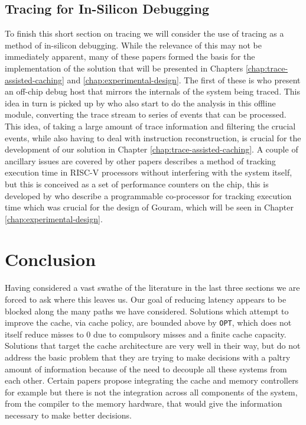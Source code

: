 \subsection{Tracing for In-Silicon Debugging}

To finish this short section on tracing we will consider the use of tracing as a method of in-silicon debugging. While the relevance of this may not be immediately apparent, many of these papers formed the basis for the implementation of the solution that will be presented in Chapters \ref{chap:trace-assisted-caching} and \ref{chap:experimental-design}. The first of these is \citet{uzelacHardwareBasedLoadValue2013} who present an off-chip debug host that mirrors the internals of the system being traced. This idea in turn is picked up by \citet{deckerOnlineAnalysisDebug2018} who also start to do the analysis in this offline module, converting the trace stream to series of events that can be processed. This idea, of taking a large amount of trace information and filtering the crucial events, while also having to deal with instruction reconstruction, is crucial for the development of our solution in Chapter \ref{chap:trace-assisted-caching}. A couple of ancillary issues are covered by other papers \citet{scheipelSystemAwarePerformanceMonitoring2017} describes a method of tracking execution time in RISC-V processors without interfering with the system itself, but this is conceived as a set of performance counters on the chip, this is developed by \citet{delshadtehraniNileProgrammableMonitoring2018} who describe a programmable co-processor for tracking execution time which was crucial for the design of Gouram, which will be seen in Chapter \ref{chap:experimental-design}. 


\section{Conclusion}

Having considered a vast swathe of the literature in the last three sections we are forced to ask where this leaves us. Our goal of reducing latency appears to be blocked along the many paths we have considered. Solutions which attempt to improve the cache, via cache policy, are bounded above by \texttt{OPT}, which does not itself reduce misses to 0 due to compulsory misses and a finite cache capacity. Solutions that target the cache architecture are very well in their way, but do not address the basic problem that they are trying to make decisions with a paltry amount of information because of the need to decouple all these systems from each other. Certain papers propose integrating the cache and memory controllers for example \cite{stuecheliCoordinatingDRAMLastLevelCache2011} but there is not the integration across all components of the system, from the compiler to the memory hardware, that would give the information necessary to make better decisions.

